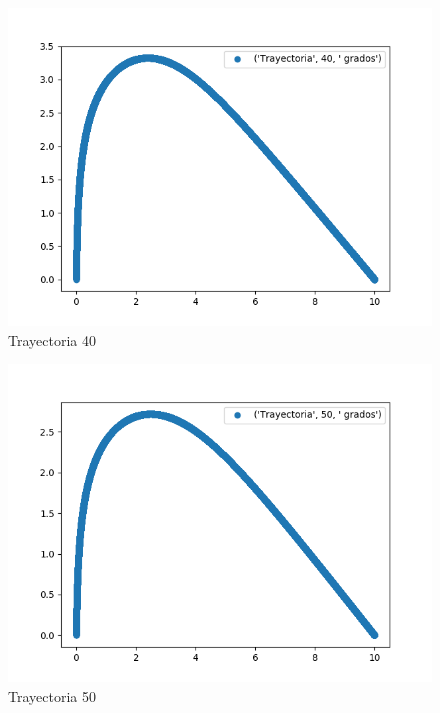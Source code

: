 \documentclass{article}
\begin{document}
\begin{figure}
  \centering
    \includegraphics{('Trayectoria', 40, ' grados').png}
  \caption{Trayectoria 40}
  \label{fig:ejemplo1}
\end{figure}
\begin{figure}
  \centering
    \includegraphics{('Trayectoria', 50, ' grados').png}
  \caption{Trayectoria 50}
  \label{fig:ejemplo1}
\end{figure}
\end{document}

